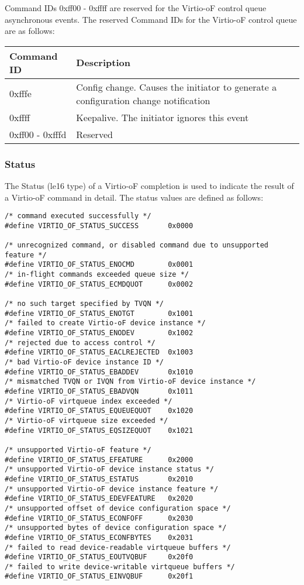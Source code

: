 Command IDs 0xff00 - 0xffff are reserved for the Virtio-oF control queue asynchronous events.
The reserved Command IDs for the Virtio-oF control queue are as follows:

\begin{tabular}{ |l|l| }
\hline
Command ID & Description \\
\hline \hline
0xfffe & Config change. Causes the initiator to generate a configuration change notification \\
\hline
0xffff & Keepalive. The initiator ignores this event \\
\hline
0xff00 - 0xfffd & Reserved \\
\hline
\end{tabular}

\subsubsection{Status}\label{sec:Virtio Transport Options / Virtio Over Fabrics / Commands Definition / Status}
The Status (le16 type) of a Virtio-oF completion is used to indicate the result of a Virtio-oF command in detail.
The status values are defined as follows:

\begin{lstlisting}
/* command executed successfully */
#define VIRTIO_OF_STATUS_SUCCESS       0x0000

/* unrecognized command, or disabled command due to unsupported feature */
#define VIRTIO_OF_STATUS_ENOCMD        0x0001
/* in-flight commands exceeded queue size */
#define VIRTIO_OF_STATUS_ECMDQUOT      0x0002

/* no such target specified by TVQN */
#define VIRTIO_OF_STATUS_ENOTGT        0x1001
/* failed to create Virtio-oF device instance */
#define VIRTIO_OF_STATUS_ENODEV        0x1002
/* rejected due to access control */
#define VIRTIO_OF_STATUS_EACLREJECTED  0x1003
/* bad Virtio-oF device instance ID */
#define VIRTIO_OF_STATUS_EBADDEV       0x1010
/* mismatched TVQN or IVQN from Virtio-oF device instance */
#define VIRTIO_OF_STATUS_EBADVQN       0x1011
/* Virtio-oF virtqueue index exceeded */
#define VIRTIO_OF_STATUS_EQUEUEQUOT    0x1020
/* Virtio-oF virtqueue size exceeded */
#define VIRTIO_OF_STATUS_EQSIZEQUOT    0x1021

/* unsupported Virtio-oF feature */
#define VIRTIO_OF_STATUS_EFEATURE      0x2000
/* unsupported Virtio-oF device instance status */
#define VIRTIO_OF_STATUS_ESTATUS       0x2010
/* unsupported Virtio-oF device instance feature */
#define VIRTIO_OF_STATUS_EDEVFEATURE   0x2020
/* unsupported offset of device configuration space */
#define VIRTIO_OF_STATUS_ECONFOFF      0x2030
/* unsupported bytes of device configuration space */
#define VIRTIO_OF_STATUS_ECONFBYTES    0x2031
/* failed to read device-readable virtqueue buffers */
#define VIRTIO_OF_STATUS_EOUTVQBUF     0x20f0
/* failed to write device-writable virtqueue buffers */
#define VIRTIO_OF_STATUS_EINVQBUF      0x20f1
\end{lstlisting}

